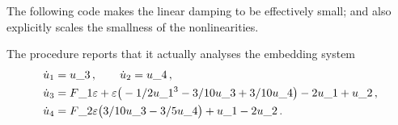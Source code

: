 The following code makes the linear damping to be
effectively small; and also explicitly scales the 
smallness of the nonlinearities.

The procedure reports that it actually analyses the
embedding system
\begin{align*}&
\dot u_{1}=u\_3\,,
\qquad
\dot u_{2}=u\_4\,,
\\&
\dot u_{3}=F\_1 \varepsilon +\varepsilon \big(-1/2 u\_1^{3}-3/
10 u\_3+3/10 u\_4\big)-2 u\_1+u\_2\,,
\\&
\dot u_{4}=F\_2 \varepsilon \big(3/10 u\_3-3/5 u\_4\big)+u\_1-2 u\_2\,.
\end{align*}



